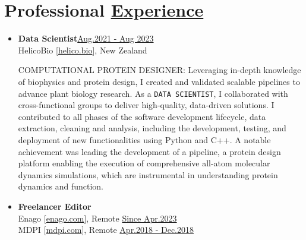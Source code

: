 
\section{Professional \href{.}{Experience}}

\begin{itemize}


    \item \textbf{\large Data Scientist}\hfill \href{.}{Aug.2021 - Aug 2023}\\
          HelicoBio [\href{www.helico.bio}{helico.bio}],
          New Zealand

              {\noindent
                  \uppercase{Computational Protein Designer:}
                  Leveraging in-depth knowledge of biophysics and protein design, I created and validated scalable pipelines to advance plant biology research. As a \texttt{DATA SCIENTIST}, I collaborated with cross-functional groups to deliver high-quality, data-driven solutions. I contributed to all phases of the software development lifecycle, data extraction, cleaning and analysis, including the development, testing, and deployment of new functionalities using Python and C++. A notable achievement was leading the development of a pipeline, a protein design platform enabling the execution of comprehensive all-atom molecular dynamics simulations, which are instrumental in understanding protein dynamics and function.

              }

    \item \textbf{\large Freelancer Editor}\\
          Enago [\href{https://www.enago.com/}{enago.com}], Remote \hfill
          \href{.}{Since Apr.2023}\\
          MDPI [\href{https://www.mdpi.com/}{mdpi.com}], Remote \hfill
          \href{.}{Apr.2018 - Dec.2018}


\end{itemize}
